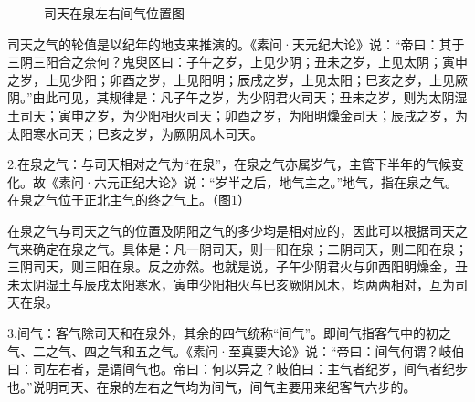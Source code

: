 \documentclass[12pt]{ctexbook}
\begin{document}
\begin{figure}[htb]%
  \centering
  \caption{司天在泉左右间气位置图}\label{fig:司天在泉左右间气位置图}
\end{figure}

司天之气的轮值是以纪年的地支来推演的。《素问·天元纪大论》说：“帝曰：其于三阴三阳合之奈何？鬼臾区曰：子午之岁，上见少阴；丑未之岁，上见太阴；寅申之岁，上见少阳；卯酉之岁，上见阳明；辰戌之岁，上见太阳；巳亥之岁，上见厥阴。”由此可见，其规律是：凡子午之岁，为少阴君火司天；丑未之岁，则为太阴湿土司天；寅申之岁，为少阳相火司天；卯酉之岁，为阳明燥金司天；辰戌之岁，为太阳寒水司天；巳亥之岁，为厥阴风木司天。

2.在泉之气：与司天相对之气为“在泉”，在泉之气亦属岁气，主管下半年的气候变化。故《素问·六元正纪大论》说：“岁半之后，地气主之。”地气，指在泉之气。在泉之气位于正北主气的终之气上。（图\ref{fig:司天在泉左右间气位置图}）

在泉之气与司天之气的位置及阴阳之气的多少均是相对应的，因此可以根据司天之气来确定在泉之气。具体是：凡一阴司天，则一阳在泉；二阴司天，则二阳在泉；三阴司天，则三阳在泉。反之亦然。也就是说，子午少阴君火与卯西阳明燥金，丑未太阴湿土与辰戌太阳寒水，寅申少阳相火与巳亥厥阴风木，均两两相对，互为司天在泉。

3.间气：客气除司天和在泉外，其余的四气统称“间气”。即间气指客气中的初之气、二之气、四之气和五之气。《素问·至真要大论》说：“帝曰：间气何谓？岐伯曰：司左右者，是谓间气也。帝曰：何以异之？岐伯曰：主气者纪岁，间气者纪步也。”说明司天、在泉的左右之气均为间气，间气主要用来纪客气六步的。
\end{document}

